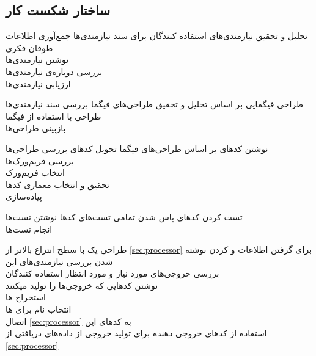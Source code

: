 \subsection{ساختار شکست کار}\label{ssec:web-app-wbs}
\begin{wbsbox}{}
\begin{wbssub}
{تحلیل و تحقیق نیازمندی‌های استفاده کنندگان  برای }
{سند نیازمندی‌ها}
\task
جمع‌آوری اطلاعات \\
\task 
طوفان فکری \\
\task 
نوشتن نیازمندی‌ها \\
\task
بررسی دوباره‌ی نیازمندی‌ها \\
\task 
ارزیابی نیازمندی‌ها
\end{wbssub}

\begin{wbssub}
{طراحی فیگمایی  بر اساس تحلیل و تحقیق }
{طراحی‌های فیگما}
\task 
بررسی سند نیازمندی‌‌ها \\
\task 
طراحی با استفاده از فیگما \\
\task 
بازبینی طراحی‌ها
\end{wbssub}

\begin{wbssub}
{نوشتن کد‌‌های  بر اساس طراحی‌های فیگما}
{تحویل کد‌های }
\task 
بررسی طراحی‌ها \\
\task 
بررسی فریم‌ورک‌‌ها \\
\task 
انتخاب فریم‌ورک \\
\task 
تحقیق و انتخاب معماری کد‌ها \\
\task 
پیاده‌سازی
\end{wbssub}

\begin{wbssub}
{تست کردن کد‌های }
{پاس شدن تمامی تست‌های کد‌ها}
\task 
نوشتن تست‌ها \\
\task
انجام تست‌ها
\end{wbssub}

\begin{wbssub}
{طراحی یک  با سطح انتزاع بالاتر از \ref{sec:processor} برای گرفتن اطلاعات و  کردن}
{نوشته شدن }
\task
بررسی نیازمندی‌های این  \\
\task
بررسی خروجی‌های مورد نیاز و مورد انتظار استفاده کنندگان \\
\task
نوشتن کد‌هایی که خروجی‌ها را تولید میکنند \\
\task
استخراج ها \\
\task 
انتخاب نام برای ها \\
\task
اتصال 
\ref{sec:processor}
به کد‌های این  \\
\task
استفاده از کد‌‌های خروجی دهنده برای تولید خروجی از داده‌های دریافتی از 
\ref{sec:processor}
\end{wbssub}


\end{wbsbox}
